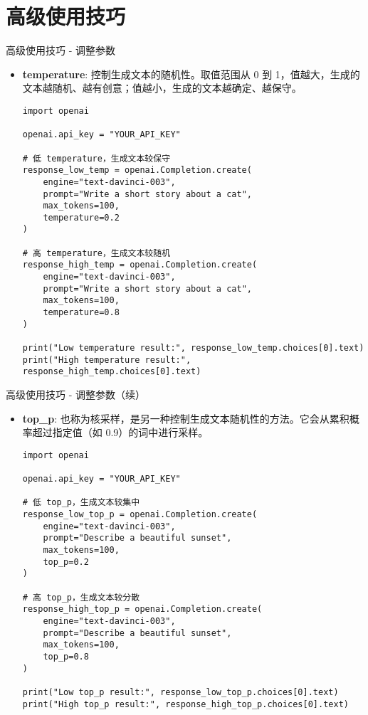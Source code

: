 \section{高级使用技巧}
\begin{frame}{高级使用技巧 - 调整参数}
    \begin{itemize}
        \item \textbf{temperature}: 控制生成文本的随机性。取值范围从 0 到 1，值越大，生成的文本越随机、越有创意；值越小，生成的文本越确定、越保守。
        \begin{lstlisting}[style=pythonstyle]
import openai

openai.api_key = "YOUR_API_KEY"

# 低 temperature，生成文本较保守
response_low_temp = openai.Completion.create(
    engine="text-davinci-003",
    prompt="Write a short story about a cat",
    max_tokens=100,
    temperature=0.2
)

# 高 temperature，生成文本较随机
response_high_temp = openai.Completion.create(
    engine="text-davinci-003",
    prompt="Write a short story about a cat",
    max_tokens=100,
    temperature=0.8
)

print("Low temperature result:", response_low_temp.choices[0].text)
print("High temperature result:", response_high_temp.choices[0].text)
        \end{lstlisting}
    \end{itemize}
\end{frame}

\begin{frame}{高级使用技巧 - 调整参数（续）}
    \begin{itemize}
        \item \textbf{top_p}: 也称为核采样，是另一种控制生成文本随机性的方法。它会从累积概率超过指定值（如 0.9）的词中进行采样。
        \begin{lstlisting}[style=pythonstyle]
import openai

openai.api_key = "YOUR_API_KEY"

# 低 top_p，生成文本较集中
response_low_top_p = openai.Completion.create(
    engine="text-davinci-003",
    prompt="Describe a beautiful sunset",
    max_tokens=100,
    top_p=0.2
)

# 高 top_p，生成文本较分散
response_high_top_p = openai.Completion.create(
    engine="text-davinci-003",
    prompt="Describe a beautiful sunset",
    max_tokens=100,
    top_p=0.8
)

print("Low top_p result:", response_low_top_p.choices[0].text)
print("High top_p result:", response_high_top_p.choices[0].text)
        \end{lstlisting}
    \end{itemize}
\end{frame}


